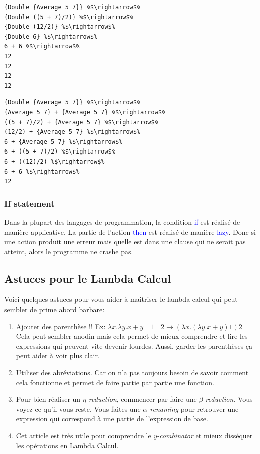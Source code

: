 \documentclass{report}
\begin{document}
\begin{center}
\begin{minipage}[t]{0.49\linewidth}
\begin{lstlisting}[escapechar=\%]
{Double {Average 5 7}} %$\rightarrow$%
{Double ((5 + 7)/2)} %$\rightarrow$%
{Double (12/2)} %$\rightarrow$%
{Double 6} %$\rightarrow$%
6 + 6 %$\rightarrow$%
12
12
12
12
\end{lstlisting}
\end{minipage}
%
\begin{minipage}[t]{0.45\linewidth}
\begin{lstlisting}[escapechar=\%]
{Double {Average 5 7}} %$\rightarrow$%
{Average 5 7} + {Average 5 7} %$\rightarrow$%
((5 + 7)/2) + {Average 5 7} %$\rightarrow$%
(12/2) + {Average 5 7} %$\rightarrow$%
6 + {Average 5 7} %$\rightarrow$%
6 + ((5 + 7)/2) %$\rightarrow$%
6 + ((12)/2) %$\rightarrow$%
6 + 6 %$\rightarrow$%
12
\end{lstlisting}
\end{minipage}
\end{center}

\subsubsection{If statement}
Dans la plupart des langages de programmation, la condition \textcolor{blue}{if} est réalisé de manière applicative. La partie de l'action \textcolor{blue}{then} est réalisé de manière \textcolor{blue}{lazy}. Donc si une action produit une erreur mais quelle est dans une clause qui ne serait pas atteint, alors le programme ne crashe pas.

\subsection{Astuces pour le Lambda Calcul}
Voici quelques astuces pour vous aider à maitriser le lambda calcul qui peut sembler de prime abord barbare:
\begin{enumerate}
\item Ajouter des parenthèse !! Ex: $\lambda x.\lambda y.x + y \quad 1 \quad 2 \rightarrow (\lambda x.(\lambda y.x+y)1)2$ Cela peut sembler anodin mais cela permet de mieux comprendre et lire les expressions qui peuvent vite devenir lourdes. Aussi, garder les parenthèses ça peut aider à voir plus clair. 
\item Utiliser des abréviations. Car on n'a pas toujours besoin de savoir comment cela fonctionne et permet de faire partie par partie une fonction.
\item Pour bien réaliser un $\eta$\textit{-reduction}, commencer par faire une $\beta$\textit{-reduction}. Vous voyez ce qu'il vous reste. Vous faites une $\alpha$\textit{-renaming} pour retrouver une expression qui correspond à une partie de l'expression de base.
\item Cet \href{https://medium.com/@ayanonagon/the-y-combinator-no-not-that-one-7268d8d9c46}{article} est très utile pour comprendre le \textit{y-combinator} et mieux disséquer les opérations en Lambda Calcul.
\end{enumerate}
\end{document}
